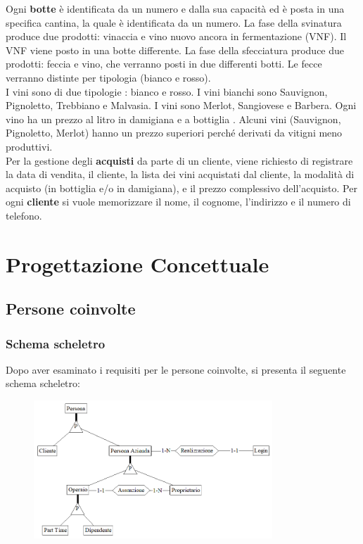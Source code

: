 \documentclass{article}
\begin{document}
{Ogni \textbf{botte} è identificata da un numero e dalla sua capacità ed è posta in una specifica cantina, la quale è identificata da un numero.
La fase della svinatura produce due prodotti: vinaccia e vino nuovo ancora in fermentazione (VNF). Il VNF viene posto in una botte differente. 
La fase della sfecciatura produce due prodotti: feccia e vino, che verranno posti in due differenti botti. Le fecce verranno distinte per tipologia (bianco e rosso).\\
I vini sono di due tipologie : bianco e rosso. I vini bianchi sono Sauvignon, Pignoletto, Trebbiano e Malvasia. I vini sono Merlot, Sangiovese e Barbera.
Ogni vino ha un prezzo al litro in damigiana e a bottiglia .
Alcuni vini (Sauvignon, Pignoletto, Merlot) hanno un prezzo superiori perché derivati da vitigni meno produttivi.\\\newline
Per la gestione degli \textbf{acquisti} da parte di un cliente, viene richiesto di registrare la data di vendita, il cliente, la lista dei vini acquistati dal cliente, la modalità di acquisto (in bottiglia e/o in damigiana), e il prezzo complessivo dell'acquisto. Per ogni \textbf{cliente} si vuole memorizzare il nome, il cognome, l'indirizzo e il numero di telefono.}\\


\newpage


\section{Progettazione Concettuale}

\subsection{Persone coinvolte}

\subsubsection{Schema scheletro}
Dopo aver esaminato i requisiti per le persone coinvolte, si presenta il seguente schema scheletro:
\begin{figure}[htbp]
\centering
\includegraphics[width=0.8\textwidth]{img/Persone_Scheletro.png}
\end{figure}
\end{document}
